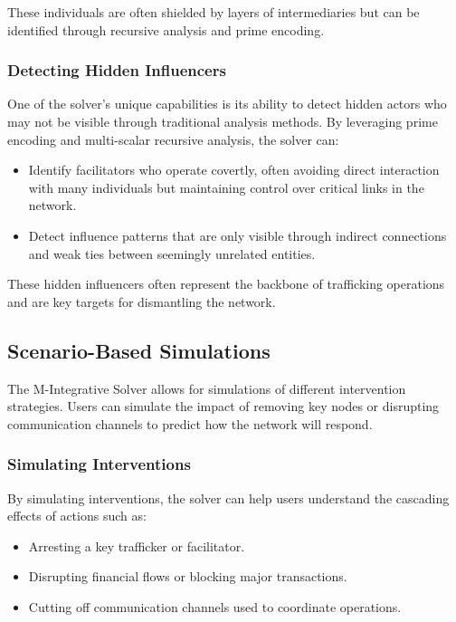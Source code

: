 \documentclass[%
 preprint, linenumbers,
 amsmath,amssymb,
 aps, physrev,
]{revtex4-2}
\begin{document}
These individuals are often shielded by layers of intermediaries but can be identified through recursive analysis and prime encoding.

\subsubsection{Detecting Hidden Influencers}

One of the solver’s unique capabilities is its ability to detect hidden actors who may not be visible through traditional analysis methods. By leveraging prime encoding and multi-scalar recursive analysis, the solver can:
\begin{itemize}
    \item Identify facilitators who operate covertly, often avoiding direct interaction with many individuals but maintaining control over critical links in the network.
    \item Detect influence patterns that are only visible through indirect connections and weak ties between seemingly unrelated entities.
\end{itemize}

These hidden influencers often represent the backbone of trafficking operations and are key targets for dismantling the network.

\subsection{Scenario-Based Simulations}

The M-Integrative Solver allows for simulations of different intervention strategies. Users can simulate the impact of removing key nodes or disrupting communication channels to predict how the network will respond.

\subsubsection{Simulating Interventions}

By simulating interventions, the solver can help users understand the cascading effects of actions such as:
\begin{itemize}
    \item Arresting a key trafficker or facilitator.
    \item Disrupting financial flows or blocking major transactions.
    \item Cutting off communication channels used to coordinate operations.
\end{itemize}
\end{document}
